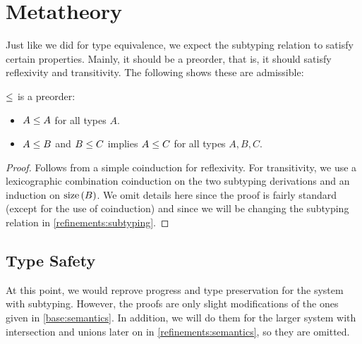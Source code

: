 
\section{Metatheory}

Just like we did for type equivalence, we expect the subtyping relation to satisfy certain properties. Mainly, it should be a preorder, that is, it should satisfy reflexivity and transitivity. The following  shows these are admissible:

\begin{theorem}
  \label{base:sub-is-preorder}
  $\le$ is a preorder:
  \begin{itemize}
    \item $A \le A$ for all types $A$.
    \item $A \le B$ and $B \le C$ implies $A \le C$ for all types $A, B, C$.
  \end{itemize}
\end{theorem}
\begin{proof}
  Follows from a simple coinduction for reflexivity. For transitivity, we use a lexicographic combination coinduction on the two subtyping derivations and an induction on $\operatorname{size}{(B)}$.  We omit details here since the proof is fairly standard (except for the use of coinduction) and since we will be changing the subtyping relation in \cref{refinements:subtyping}.
\end{proof}


\subsection{Type Safety}

At this point, we would reprove progress and type preservation for the system with subtyping. However, the proofs are only slight modifications of the ones given in \cref{base:semantics}. In addition, we will do them for the larger system with intersection and unions later on in \cref{refinements:semantics}, so they are omitted.

